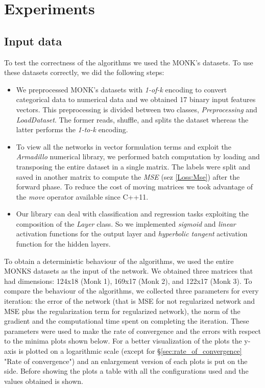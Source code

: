 \section{Experiments}

\subsection{Input data}
To test the correctness of the algorithms we used the MONK's datasets. To use these datasets correctly, we did the following steps:
\begin{itemize}
	\item We preprocessed MONK's datasets with \textit{1-of-k} encoding to convert categorical data to numerical data and we obtained 17 binary input features vectors. This preprocessing is divided between two classes, \textit{Preprocessing} and \textit{LoadDataset}. The former reads, shuffle, and splits the dataset whereas the latter performs the \textit{1-to-k} encoding. 
	\item To view all the networks in vector formulation terms and exploit the \textit{Armadillo} numerical library, we performed batch computation by loading and transposing the entire dataset in a single matrix. The labels were split and saved in another matrix to compute the \textit{MSE} (sez \ref{Loss:Mse}) after the forward phase. To reduce the cost of moving matrices we took advantage of the \textit{move} operator available since C++11. 
	\item Our library can deal with classification and regression tasks exploiting the composition of the \textit{Layer} class.  So we implemented \textit{sigmoid} and \textit{linear} activation functions for the output layer and \textit{hyperbolic tangent} activation function for the hidden layers.
\end{itemize}



To obtain a deterministic behaviour of the algorithms, we used the entire MONKS datasets as the input of the network. We obtained three matrices that had dimensions: 124x18 (Monk 1), 169x17 (Monk 2), and 122x17 (Monk 3). To compare the behaviour of the algorithms, we collected three parameters for every iteration: the error of the network (that is MSE for not regularized network and MSE plus the regularization term for regularized network), the norm of the gradient and the computational time spent on completing the iteration. These parameters were used to make the rate of convergence and the errors with respect to the minima plots shown below. For a better visualization of the plots the y-axis is plotted on a logarithmic scale (except for \S \ref{sec:rate_of_convergence} "Rate of convergence") and an enlargement version of each plots is put on the side. Before showing the plots a table with all the configurations used and the values obtained is shown.

